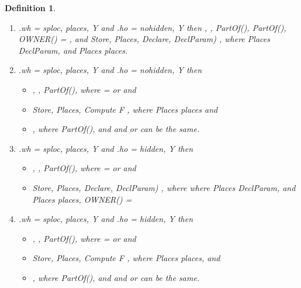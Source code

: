 \documentclass[a4paper]{article}
\newtheorem{ttd}{Definition}
\begin{document}
\begin{ttd}
\begin{enumerate}
\begin{enumerate}
\item .\textit{wh} = \textit{sploc}, \textit{places}, Y and .\textit{ho} = \textit{nohidden}, Y then , ,   \textit{PartOf}(),   \textit{PartOf}(), OWNER() = , and \textit{Store}, \textit{Places}, \textit{Declare}, \textit{DeclParam})  , where \textit{Places}  \textit{DeclParam}, and \textit{Places}  \textit{places}. 

\item .\textit{wh} = \textit{sploc}, \textit{places}, Y and .\textit{ho} = \textit{nohidden}, Y then 

\begin{itemize} 
\item , ,   \textit{PartOf}(), where  =  or    and 

\item \textit{Store}, \textit{Places}, \textit{Compute}  F  , where \textit{Places}  \textit{places} and 

\item , where   \textit{PartOf}(), and  and  or  can be the same.

\end{itemize} 

\item .\textit{wh} = \textit{sploc}, \textit{places}, Y and .\textit{ho} = \textit{hidden}, Y then \begin{itemize} 
\item , ,   \textit{PartOf}(), where  =  or    and 

\item \textit{Store}, \textit{Places},  \textit{Declare}, \textit{DeclParam})  ,  where where \textit{Places}  \textit{DeclParam}, and \textit{Places}  \textit{places}, OWNER() = 
\end{itemize}

\item .\textit{wh} = \textit{sploc}, \textit{places}, Y and .\textit{ho} = \textit{hidden}, Y then \begin{itemize} 
\item , ,   \textit{PartOf}(), where  =  or    and 

\item \textit{Store}, \textit{Places}, \textit{Compute}  F  ,  where \textit{Places}  \textit{places}, and 

\item , where   \textit{PartOf}(), and  and  or  can be the same.

\end{itemize} 



\end{enumerate}
\end{enumerate}
\end{ttd}
\end{document}
